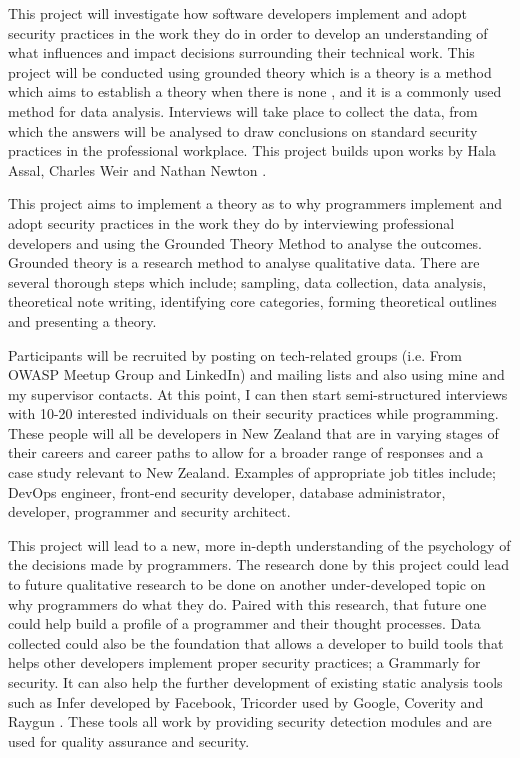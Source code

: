 \newline
\par This project will investigate how software developers implement and adopt security practices in the work they do in order to develop an understanding of what influences and impact decisions surrounding their technical work. This project will be conducted using grounded theory which is a theory is a method which aims to establish a theory when there is none \cite{2}, and it is a commonly used method for data analysis. Interviews will take place to collect the data, from which the answers will be analysed to draw conclusions on standard security practices in the professional workplace. This project builds upon works by Hala Assal, Charles Weir and Nathan Newton \cite{summary1, 1, nathan}. 
\newline
\par This project aims to implement a theory as to why programmers implement and adopt security practices in the work they do by interviewing professional developers and using the Grounded Theory Method to analyse the outcomes. Grounded theory is a research method to analyse qualitative data. There are several thorough steps which include; sampling, data collection, data analysis, theoretical note writing, identifying core categories, forming theoretical outlines and presenting a theory.
\newline
\par Participants will be recruited by posting on tech-related groups (i.e. From OWASP Meetup Group and LinkedIn) and mailing lists and also using mine and my supervisor contacts. At this point, I can then start semi-structured interviews with 10-20 interested individuals on their security practices while programming. These people will all be developers in New Zealand that are in varying stages of their careers and career paths to allow for a broader range of responses and a case study relevant to New Zealand. Examples of appropriate job titles include; DevOps engineer, front-end security developer, database administrator, developer, programmer and security architect.
\newline
\par This project will lead to a new, more in-depth understanding of the psychology of the decisions made by programmers. The research done by this project could lead to future qualitative research to be done on another under-developed topic on why programmers do what they do. Paired with this research, that future one could help build a profile of a programmer and their thought processes. Data collected could also be the foundation that allows a developer to build tools that helps other developers implement proper security practices; a Grammarly for security. It can also help the further development of existing static analysis tools such as Infer developed by Facebook, Tricorder used by Google, Coverity and Raygun \cite{infer, tri, coverity, raygun}. These tools all work by providing security detection modules and are used for quality assurance and security. 
